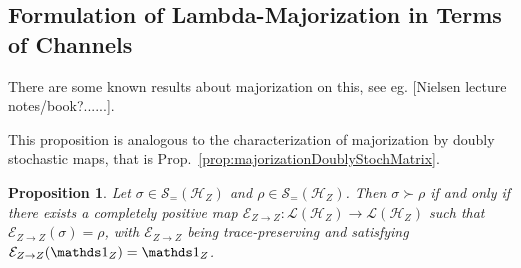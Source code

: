 \documentclass[10pt,letterpaper]{article}
\theoremstyle{plain}
\newtheorem{prop}[thm]{Proposition}
\def\Hs{\mathscr{H}}%
\newcommand{\LOps}{\mathscr{L}}
\newcommand{\DOps}{\mathscr{S}_=}
\begin{document}
\subsection{Formulation of Lambda-Majorization in Terms of Channels}

There are some known results about majorization on this, see eg. [Nielsen lecture notes/book?......].

This proposition is analogous to the characterization of majorization by doubly stochastic maps, that
is Prop.~\ref{prop:majorizationDoublyStochMatrix}.
\begin{prop}
  \label{prop:MajorizationUnitalCPM}
  Let $\sigma\in\DOps(\Hs_Z)$ and $\rho\in\DOps(\Hs_Z)$. Then $\sigma\succ\rho$ if and only if
  there exists a completely positive map $\mathcal{E}_{Z\rightarrow Z} : \LOps(\Hs_Z)\rightarrow\LOps(\Hs_Z)$
  such that $\mathcal{E}_{Z\rightarrow Z}(\sigma) = \rho$, with $\mathcal{E}_{Z\rightarrow Z}$ being
  trace-preserving and satisfying $\mathcal{E}_{Z\rightarrow Z}(\Ident_Z) = \Ident_Z$.
\end{prop}
\end{document}

